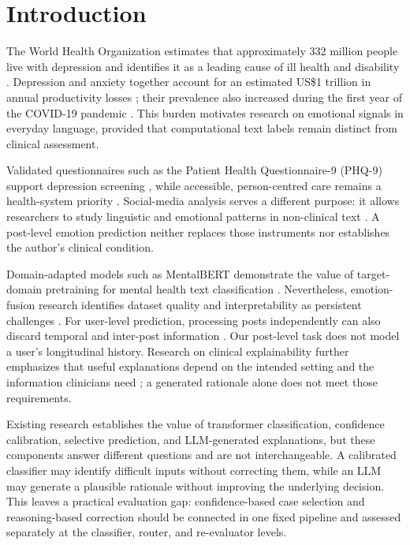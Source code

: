 \documentclass{ieeeaccess}
\begin{document}
\titlepgskip=-21pt
\maketitle
\raggedbottom

\section{Introduction}

The World Health Organization estimates that approximately 332 million people live with depression \cite{ref1} and identifies it as a leading cause of ill health and disability \cite{ref2}. Depression and anxiety together account for an estimated US\$1 trillion in annual productivity losses \cite{ref3}; their prevalence also increased during the first year of the COVID-19 pandemic \cite{ref4}. This burden motivates research on emotional signals in everyday language, provided that computational text labels remain distinct from clinical assessment.

Validated questionnaires such as the Patient Health Questionnaire-9 (PHQ-9) support depression screening \cite{ref5}, while accessible, person-centred care remains a health-system priority \cite{ref6}. Social-media analysis serves a different purpose: it allows researchers to study linguistic and emotional patterns in non-clinical text \cite{ref7}. A post-level emotion prediction neither replaces those instruments nor establishes the author's clinical condition.

Domain-adapted models such as MentalBERT demonstrate the value of target-domain pretraining for mental health text classification \cite{ref8}. Nevertheless, emotion-fusion research identifies dataset quality and interpretability as persistent challenges \cite{ref9}. For user-level prediction, processing posts independently can also discard temporal and inter-post information \cite{ref10}. Our post-level task does not model a user's longitudinal history. Research on clinical explainability further emphasizes that useful explanations depend on the intended setting and the information clinicians need \cite{ref11}; a generated rationale alone does not meet those requirements.

Existing research establishes the value of transformer classification, confidence calibration, selective prediction, and LLM-generated explanations, but these components answer different questions and are not interchangeable. A calibrated classifier may identify difficult inputs without correcting them, while an LLM may generate a plausible rationale without improving the underlying decision. This leaves a practical evaluation gap: confidence-based case selection and reasoning-based correction should be connected in one fixed pipeline and assessed separately at the classifier, router, and re-evaluator levels.
\end{document}
